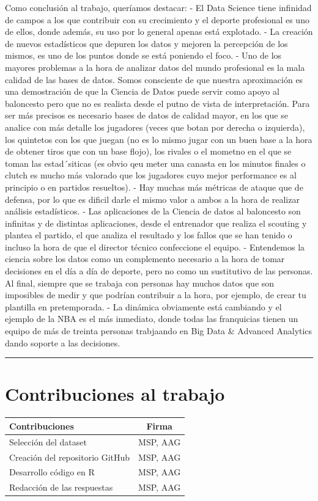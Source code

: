 \documentclass[
]{article}
\begin{document}
Como conclusión al trabajo, queríamos destacar: - El Data Science tiene
infinidad de campos a los que contribuir con su crecimiento y el deporte
profesional es uno de ellos, donde además, su uso por lo general apenas
está explotado. - La creación de nuevos estadísticos que depuren los
datos y mejoren la percepción de los mismos, es uno de los puntos donde
se está poniendo el foco. - Uno de los mayores problemas a la hora de
analizar datos del mundo profesional es la mala calidad de las bases de
datos. Somos consciente de que nuestra aproximación es una demostración
de que la Ciencia de Datos puede servir como apoyo al baloncesto pero
que no es realista desde el putno de vista de interpretación. Para ser
más precisos es necesario bases de datos de calidad mayor, en los que se
analice con más detalle los jugadores (veces que botan por derecha o
izquierda), los quintetos con los que juegan (no es lo mismo jugar con
un buen base a la hora de obtener tiros que con un base flojo), los
rivales o el mometno en el que se toman las estad´siticas (es obvio qeu
meter una canasta en los minutos finales o clutch es mucho más valorado
que los jugadores cuyo mejor performance es al principio o en partidos
resueltos). - Hay muchas más métricas de ataque que de defensa, por lo
que es dificil darle el mismo valor a ambos a la hora de realizar
análisis estadísticos. - Las aplicaciones de la Ciencia de datos al
baloncesto son infinitas y de distintas aplicaciones, desde el
entrenador que realiza el scouting y plantea el partido, el que analiza
el resultado y los fallos que se han tenido o incluso la hora de que el
director técnico confeccione el equipo. - Entendemos la ciencia sobre
los datos como un complemento necesario a la hora de tomar decisiones en
el día a día de deporte, pero no como un sustitutivo de las personas. Al
final, siempre que se trabaja con personas hay muchos datos que son
imposibles de medir y que podrían contribuir a la hora, por ejemplo, de
crear tu plantilla en pretemporada. - La dinámica obviamente está
cambiando y el ejemplo de la NBA es el más inmediato, donde todas las
franquicias tienen un equipo de más de treinta personas trabjaando en
Big Data \& Advanced Analytics dando soporte a las decisiones.

\begin{center}\rule{0.5\linewidth}{0.5pt}\end{center}

\hypertarget{contribuciones-al-trabajo}{%
\section{Contribuciones al trabajo}\label{contribuciones-al-trabajo}}

\begin{longtable}[]{@{}lc@{}}
\toprule
\textbf{Contribuciones} & \textbf{Firma}\tabularnewline
\midrule
\endhead
Selección del dataset & MSP, AAG\tabularnewline
Creación del repositorio GitHub & MSP, AAG\tabularnewline
Desarrollo código en R & MSP, AAG\tabularnewline
Redacción de las respuestas & MSP, AAG\tabularnewline
\bottomrule
\end{longtable}
\end{document}
